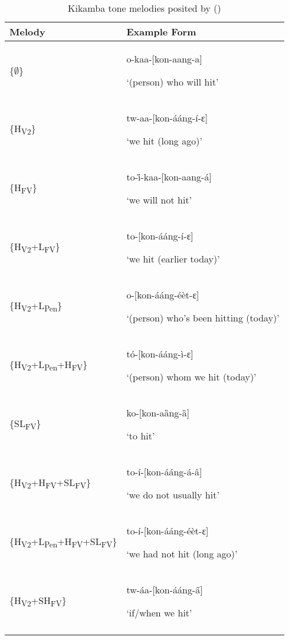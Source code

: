 \documentclass[output=paper
,newtxmath
,modfonts
,nonflat]{langsci/langscibook}
\begin{document}
\begin{table}
\begin{tabularx}{\textwidth}{lQ}
\lsptoprule
 Melody &  Example Form\\\midrule
\{${\emptyset}$\} & {o-kaa-[kon-aang-a]}

‘(person) who will hit’\\

\tablevspace
\{H\textsubscript{V2}\} & {tw-aa-[kon-ááng-í-ɛ]}

‘we hit (long ago)’\\

\tablevspace
\{H\textsubscript{FV}\} & {to-\H{i}-kaa-[kon-aang-á]}

‘we will not hit’\\

\tablevspace
\{H\textsubscript{V2}+L\textsubscript{FV}\} & {to-[kon-ááng-í-ɛ]}

‘we hit (earlier today)’\\

\tablevspace
\{H\textsubscript{V2}+L\textsubscript{Pen}\} & {o-[kon-ááng-éèt-ɛ]}

‘(person) who’s been hitting (today)’\\

\tablevspace
\{H\textsubscript{V2}+L\textsubscript{Pen}+H\textsubscript{FV}\} & {tó-[kon-ááng-ì-ɛ]}

‘(person) whom we hit (today)’\\

\tablevspace
\{SL\textsubscript{FV}\} & {ko-[kon-aȁng-ȁ]}

‘to hit’\\

\tablevspace
\{H\textsubscript{V2}+H\textsubscript{FV}+SL\textsubscript{FV}\} & {to-í-[kon-ááng-á-â]}

‘we do not usually hit’\\

\tablevspace
\{H\textsubscript{V2}+L\textsubscript{Pen}+H\textsubscript{FV}+SL\textsubscript{FV}\} & {to-í-[kon-ááng-éèt-ɛ]}

‘we had not hit (long ago)’\\

\tablevspace
\{H\textsubscript{V2}+SH\textsubscript{FV}\} & {tw-áa-[kon-ááng-\H{a}]}

‘if/when we hit’\\
\lspbottomrule 
\end{tabularx}
\caption{Kikamba tone melodies posited by \citeauthor{Roberts-Kohno2000} (\citeyear{Roberts-Kohno2000,Roberts-Kohno2014})}
\label{tab:jones:2}
\end{table}
\end{document}
